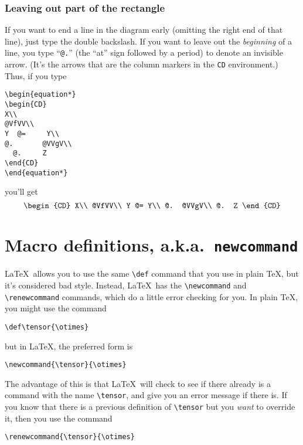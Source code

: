 \subsubsection*{Leaving out part of the rectangle}

If you want to end a line in the diagram early (omitting the right
end of that line), just type the double backslash.  If you want to
leave out the {\em beginning\/} of a line, you type ``\verb"@."''
(the ``at'' sign followed by a period) to denote an invisible arrow.
(It's the arrows that are the column markers in the \verb"CD"
environment.)  Thus, if you type
\begin{verbatim}
\begin{equation*}
\begin{CD}
X\\
@VfVV\\
Y  @=     Y\\
@.       @VVgV\\
  @.     Z
\end{CD}
\end{equation*}
\end{verbatim}
you'll get
\begin{equation*}
\begin{CD}
X\\
@VfVV\\
Y  @=     Y\\
@.       @VVgV\\
  @.     Z
\end{CD}
\end{equation*}





\section{Macro definitions, a.k.a.\ {\tt newcommand}}
\label{sec:definitions}


\LaTeX\ allows you to use the same \verb"\def" command that you use
in plain \TeX, but it's considered bad style.  Instead, \LaTeX\ has
the \verb"\newcommand" and \verb"\renewcommand" commands, which do a
little error checking for you.  In plain \TeX, you might use the
command
\begin{center}
\verb"\def\tensor{\otimes}"
\end{center}
but in \LaTeX, the preferred form is
\begin{center}
\verb"\newcommand{\tensor}{\otimes}"
\end{center}
The advantage of this is that \LaTeX\ will check to see if there
already is a command with the name \verb"\tensor", and give you an
error message if there is.  If you know that there is a previous
definition of \verb"\tensor" but you {\em want\/} to override it,
then you use the command
\begin{center}
\verb"\renewcommand{\tensor}{\otimes}"
\end{center}


